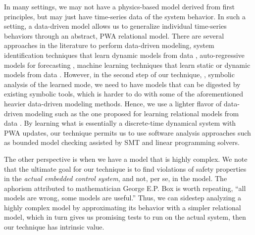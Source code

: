 In many settings, we may not have a physics-based model derived from
first principles, but may just have time-series data of the system
behavior. In such a setting, a data-driven model allows us to
generalize individual time-series behaviors through an abstract, PWA
relational model. There are several approaches in the literature to
perform data-driven modeling, system identification techniques that
learn dynamic models from data \cite{ljung1999system}, auto-regressive
models for forecasting \cite{wei1994time}, machine learning techniques
that learn static or dynamic models from data
\cite{narendra1990identification,lu2009linear}. However, in the second
step of our technique, \ie, symbolic analysis of the learned mode, we
need to have models that can be digested by existing symbolic tools,
which is harder to do with some of the aforementioned heavier
data-driven modeling methods. Hence, we use a lighter flavor of
data-driven modeling such as the one proposed for learning relational
models from data
\cite{zutshi2012timed,sankaranarayanan2011relational}. By learning
what is essentially a discrete-time dynamical system with PWA updates,
our technique permits us to use software analysis approaches such as
bounded model checking assisted by SMT and linear programming solvers.

The other perspective is when we have a model that is highly complex.
We note that the ultimate goal for our technique is to find violations
of safety properties in the {\em actual embedded control system}, and
not, per se, in the model. The aphorism attributed to mathematician
George E.P. Box is worth repeating,  ``all models are wrong, some
models are useful.'' Thus, we can sidestep analyzing a highly complex
model by approximating its behavior with a simpler relational model,
which in turn gives us promising tests to run on the actual system,
then our technique has intrinsic value.


